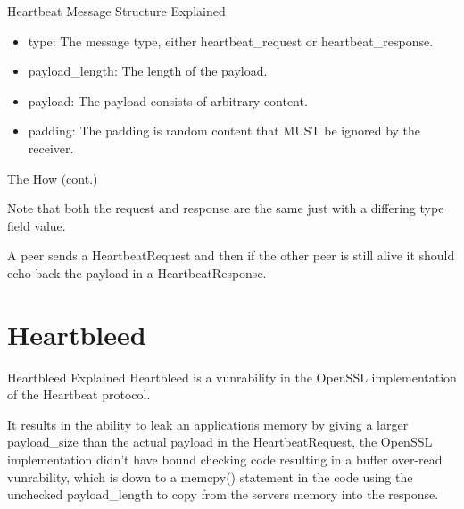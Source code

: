 \documentclass{beamer}
\begin{document}
  \begin{frame}{Heartbeat Message Structure Explained}
  \begin{itemize}
   \item

    type:  The message type, either heartbeat\_request or
    heartbeat\_response.


    \item
   payload\_length:  The length of the payload.

    \item
   payload:  The payload consists of arbitrary content.


   \item
   padding:  The padding is random content that MUST be ignored by the
   receiver.
  \end{itemize}

  \end{frame}

  \begin{frame}{The How (cont.)}

    Note that both the request and response are the same just with a differing type field value.

    A peer sends a HeartbeatRequest and then if the other peer is still alive it should echo
    back the payload in a HeartbeatResponse.

  \end{frame}

  \section{Heartbleed}
  \begin{frame}{Heartbleed Explained}
 Heartbleed is a vunrability in the OpenSSL implementation of the Heartbeat protocol.

 It results in the ability to leak an applications memory by giving a larger payload\_size
 than the actual payload in the HeartbeatRequest, the OpenSSL implementation didn't have
 bound checking code resulting in a buffer over-read vunrability, which is down to a
 memcpy() statement in the code using the unchecked payload\_length to copy from the servers
 memory into the response.

  \end{frame}
\end{document}
